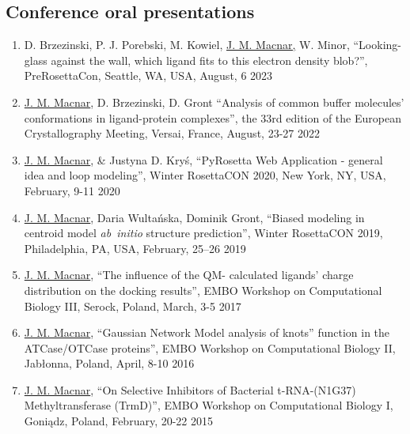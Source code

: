 \documentclass[verylight]{simplehipstercv}
\begin{document}
\begin{paracol}{2}
{\begin{minipage}[t]{0.7\textwidth}
\section*{Conference oral presentations}
\begin{enumerate}
    \item  D. Brzezinski, P. J. Porebski, M. Kowiel, \underline{J. M. Macnar,} W. Minor, ``Looking-glass against the wall, which ligand fits to this electron density blob?'', PreRosettaCon, Seattle, WA, USA, August, 6 2023\vspace{-0.4em}
    
    \item \underline{J. M. Macnar}, D. Brzezinski, D. Gront ``Analysis of common buffer molecules' conformations in ligand-protein complexes'', the 33rd edition of the European Crystallography Meeting, Versai, France, August, 23-27 2022\vspace{-0.4em}

    \item \underline{J. M. Macnar}, \& Justyna D. Kryś, ``PyRosetta Web Application - general idea and loop modeling'', Winter RosettaCON 2020, New York, NY, USA, February, 9-11 2020\vspace{-0.4em}
    
    \item  \underline{J. M. Macnar}, Daria Wultańska, Dominik Gront, ``Biased modeling in centroid model \textit{ab~initio} structure prediction'', Winter RosettaCON 2019, Philadelphia, PA, USA, February, 25--26 2019\vspace{-0.4em}

    \item \underline{J. M. Macnar}, ``The influence of the QM- calculated ligands’ charge distribution on the docking results'', EMBO Workshop on Computational Biology III, Serock, Poland, March, 3-5 2017\vspace{-0.4em}
    
    \item \underline{J. M. Macnar}, ``Gaussian Network Model analysis of knots'' function in the ATCase/OTCase proteins'', EMBO Workshop on Computational Biology II, Jabłonna, Poland, April, 8-10 2016\vspace{-0.4em}

    \item \underline{J. M. Macnar}, ``On Selective Inhibitors of Bacterial t-RNA-(N1G37) Methyltransferase (TrmD)'', EMBO Workshop on Computational Biology I, Goniądz, Poland, February, 20-22 2015


\end{enumerate}
\end{minipage}}
\end{paracol}
\end{document}
